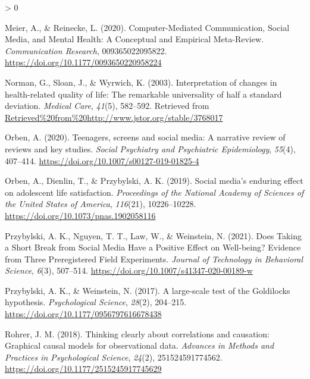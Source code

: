 \documentclass[
  english,
  man,floatsintext]{apa6}
\newlength{\cslhangindent}
\newenvironment{CSLReferences}[2] %
 {%
  \setlength{\parindent}{0pt}
  \ifodd #1 \everypar{\setlength{\hangindent}{\cslhangindent}}\ignorespaces\fi
  \ifnum #2 > 0
  \setlength{\parskip}{#2\baselineskip}
  \fi
 }%
 {}
\begin{document}
\begin{CSLReferences}{1}{0}
\leavevmode\hypertarget{ref-meierComputerMediatedCommunicationSocial2020}{}%
Meier, A., \& Reinecke, L. (2020). Computer-{Mediated} {Communication}, {Social} {Media}, and {Mental} {Health}: {A} {Conceptual} and {Empirical} {Meta}-{Review}. \emph{Communication Research}, 009365022095822. \url{https://doi.org/10.1177/0093650220958224}

\leavevmode\hypertarget{ref-normanInterpretationChangesHealthrelated2003}{}%
Norman, G., Sloan, J., \& Wyrwich, K. (2003). Interpretation of changes in health-related quality of life: {The} remarkable universality of half a standard deviation. \emph{Medical Care}, \emph{41}(5), 582--592. Retrieved from \url{Retrieved\%20from\%20http://www.jstor.org/stable/3768017}

\leavevmode\hypertarget{ref-orbenTeenagersScreensSocial2020}{}%
Orben, A. (2020). Teenagers, screens and social media: A narrative review of reviews and key studies. \emph{Social Psychiatry and Psychiatric Epidemiology}, \emph{55}(4), 407--414. \url{https://doi.org/10.1007/s00127-019-01825-4}

\leavevmode\hypertarget{ref-orbenSocialMediaEnduring2019}{}%
Orben, A., Dienlin, T., \& Przybylski, A. K. (2019). Social media's enduring effect on adolescent life satisfaction. \emph{Proceedings of the National Academy of Sciences of the United States of America}, \emph{116}(21), 10226--10228. \url{https://doi.org/10.1073/pnas.1902058116}

\leavevmode\hypertarget{ref-przybylskiDoesTakingShort2021a}{}%
Przybylski, A. K., Nguyen, T. T., Law, W., \& Weinstein, N. (2021). Does {Taking} a {Short} {Break} from {Social} {Media} {Have} a {Positive} {Effect} on {Well}-being? {Evidence} from {Three} {Preregistered} {Field} {Experiments}. \emph{Journal of Technology in Behavioral Science}, \emph{6}(3), 507--514. \url{https://doi.org/10.1007/s41347-020-00189-w}

\leavevmode\hypertarget{ref-przybylskiLargescaleTestGoldilocks2017}{}%
Przybylski, A. K., \& Weinstein, N. (2017). A large-scale test of the {Goldilocks} hypothesis. \emph{Psychological Science}, \emph{28}(2), 204--215. \url{https://doi.org/10.1177/0956797616678438}

\leavevmode\hypertarget{ref-rohrerThinkingClearlyCorrelations2018}{}%
Rohrer, J. M. (2018). Thinking clearly about correlations and causation: {Graphical} causal models for observational data. \emph{Advances in Methods and Practices in Psychological Science}, \emph{24}(2), 251524591774562. \url{https://doi.org/10.1177/2515245917745629}


\end{CSLReferences}
\end{document}
